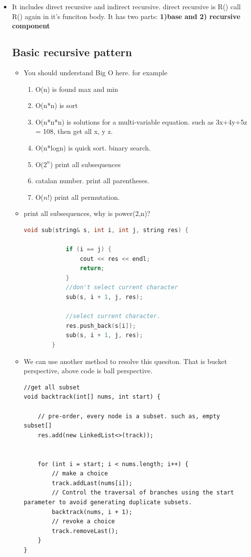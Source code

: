 \documentclass[a4paper,11pt,twoside]{book}
\begin{document}
\begin{itemize}
\begin{enumerate}
\end{enumerate}

	\item It includes direct recursive and indirect recursive. direct recursive is R() call R() again in it's funciton body. It has two parts: \textbf{1)base and 2) recursive component}
	
\subsection{Basic recursive pattern}
\begin{itemize}
	\item You should understand Big O here. for example 
	\begin{enumerate}
		\item O(n) is found max and min
		\item O(n*n) is sort
		\item O(n*n*n) is  solutions for a multi-variable equation. such as 3x+4y+5z = 108, then get all x, y z.
		\item O(n*logn) is quick sort. binary search. 
		\item O($2^{n}$) print all subsequences
		\item catalan number. print all parentheses.
		\item O($n!$) print all permutation.
		
	\end{enumerate}
		
	\item print all subsequences, why is power(2,n)?
	\begin{lstlisting}[frame=single, language=c++]
		void sub(string& s, int i, int j, string res) {
			
			if (i == j) {
				cout << res << endl;
				return;
			}
			//don't select current character
			sub(s, i + 1, j, res);
			
			//select current character.
			res.push_back(s[i]);
			sub(s, i + 1, j, res);
		}
	\end{lstlisting}
\item We can use another method to resolve this quesiton. That is bucket perspective, above code is ball perspective. 
\begin{lstlisting}
//get all subset
void backtrack(int[] nums, int start) {
	
	// pre-order, every node is a subset. such as, empty subset[]
	res.add(new LinkedList<>(track));
	
	
	for (int i = start; i < nums.length; i++) {
		// make a choice
		track.addLast(nums[i]);
		// Control the traversal of branches using the start parameter to avoid generating duplicate subsets.
		backtrack(nums, i + 1);
		// revoke a choice
		track.removeLast();
	}
}
\end{lstlisting}
	

\end{itemize}
\end{itemize}
\end{document}

